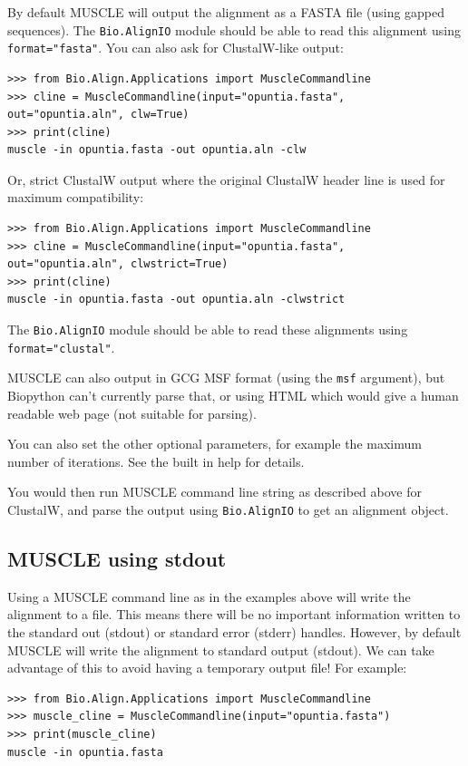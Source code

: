 \documentclass{report}
\begin{document}
By default MUSCLE will output the alignment as a FASTA file (using gapped
sequences). The \verb|Bio.AlignIO| module should be able to read this
alignment using \texttt{format="fasta"}.
You can also ask for ClustalW-like output:

\begin{verbatim}
>>> from Bio.Align.Applications import MuscleCommandline
>>> cline = MuscleCommandline(input="opuntia.fasta", out="opuntia.aln", clw=True)
>>> print(cline)
muscle -in opuntia.fasta -out opuntia.aln -clw
\end{verbatim}

Or, strict ClustalW output where the original ClustalW header line is
used for maximum compatibility:

\begin{verbatim}
>>> from Bio.Align.Applications import MuscleCommandline
>>> cline = MuscleCommandline(input="opuntia.fasta", out="opuntia.aln", clwstrict=True)
>>> print(cline)
muscle -in opuntia.fasta -out opuntia.aln -clwstrict
\end{verbatim}

\noindent The \verb|Bio.AlignIO| module should be able to read these alignments
using \texttt{format="clustal"}.

MUSCLE can also output in GCG MSF format (using the \texttt{msf} argument), but
Biopython can't currently parse that, or using HTML which would give a human
readable web page (not suitable for parsing).

You can also set the other optional parameters, for example the maximum number
of iterations. See the built in help for details.

You would then run MUSCLE command line string as described above for
ClustalW, and parse the output using \verb|Bio.AlignIO| to get an
alignment object.

\subsection{MUSCLE using stdout}

Using a MUSCLE command line as in the examples above will write the alignment
to a file. This means there will be no important information written to the
standard out (stdout) or standard error (stderr) handles. However, by default
MUSCLE will write the alignment to standard output (stdout). We can take
advantage of this to avoid having a temporary output file! For example:

\begin{verbatim}
>>> from Bio.Align.Applications import MuscleCommandline
>>> muscle_cline = MuscleCommandline(input="opuntia.fasta")
>>> print(muscle_cline)
muscle -in opuntia.fasta
\end{verbatim}
\end{document}
